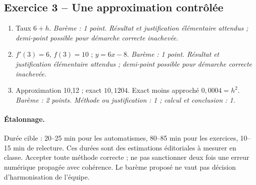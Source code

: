 \subsection*{Exercice 3 -- Une approximation contrôlée}
\begin{enumerate}
\item Taux $6+h$. \textit{Barème : 1 point. Résultat et justification élémentaire attendus ; demi-point possible pour démarche correcte inachevée.}
\item $f\prime(3)=6$, $f(3)=10$ ; $y=6x-8$. \textit{Barème : 1 point. Résultat et justification élémentaire attendus ; demi-point possible pour démarche correcte inachevée.}
\item Approximation 10,12 ; exact $10{,}1204$. Exact moins approché $0{,}0004=h^2$. \textit{Barème : 2 points. Méthode ou justification : 1 ; calcul et conclusion : 1.}
\end{enumerate}
\paragraph{Étalonnage.} Durée cible : 20–25 min pour les automatismes, 80–85 min pour les exercices, 10–15 min de relecture. Ces durées sont des estimations éditoriales à mesurer en classe. Accepter toute méthode correcte ; ne pas sanctionner deux fois une erreur numérique propagée avec cohérence. Le barème proposé ne vaut pas décision d’harmonisation de l’équipe.
